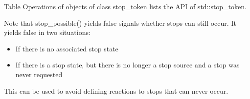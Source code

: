 
Table Operations of objects of class stop\_token lists the API of std::stop\_token.

Note that stop\_possible() yields false signals whether stops can still occur. It yields false in two situations:

\begin{itemize}
\item 
If there is no associated stop state

\item 
If there is a stop state, but there is no longer a stop source and a stop was never requested
\end{itemize}

This can be used to avoid defining reactions to stops that can never occur.

